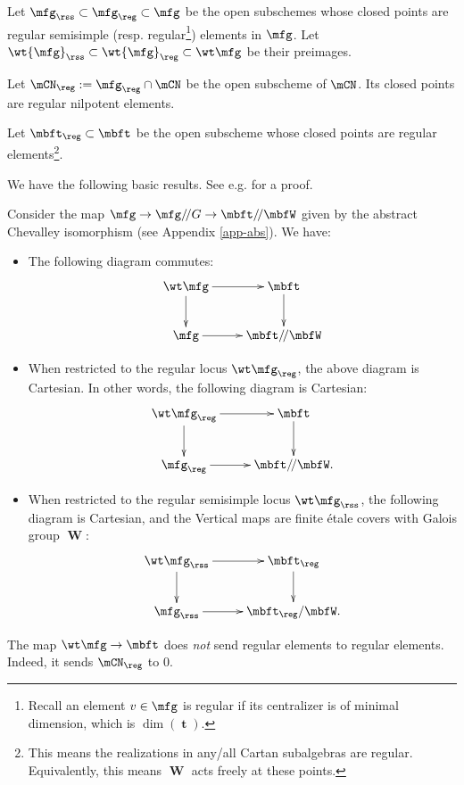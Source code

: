 	\begin{notn}
		Let $\mfg_\rss \subset \mfg_\reg \subset \mfg$ be the open subschemes whose closed points are regular semisimple (resp. regular\footnote{Recall an element $v\in \mfg$ is regular if its centralizer is of minimal dimension, which is $\dim(\mbft)$.}) elements in $\mfg$. Let $\wt{\mfg}_\rss\subset \wt{\mfg}_\reg \subset \wt\mfg$ be their preimages.

		Let $\mCN_\reg:=\mfg_\reg\cap \mCN$ be the open subscheme of $\mCN$. Its closed points are regular nilpotent elements.

		Let $\mbft_\reg\subset \mbft$ be the open subscheme whose closed points are regular elements\footnote{This means the realizations in any/all Cartan subalgebras are regular. Equivalently, this means $\mbfW$ acts freely at these points.}.
	\end{notn}

	We have the following basic results. See e.g. \cite[Section 3.1]{CG} for a proof.

	\begin{prop}
		\label{prop-Groth-alt}
		Consider the map $\mfg \to \mfg/\!/G \to \mbft/\!/\mbfW$ given by the abstract Chevalley isomorphism (see Appendix \ref{app-abs}). We have:
		\begin{itemize}
			\item[(1)]
				The following diagram commutes:
				\[
					\xymatrix{
						\wt\mfg \ar[r] \ar[d] & \mbft \ar[d] \\
						\mfg \ar[r] & \mbft/\!/\mbfW
					}
				\]
			\item[(2)]
				When restricted to the regular locus $\wt\mfg_\reg$, the above diagram is Cartesian. In other words, the following diagram is Cartesian:
				\[
					\xymatrix{
						\wt\mfg_\reg \ar[r] \ar[d] & \mbft \ar[d] \\
						\mfg_\reg \ar[r] & \mbft/\!/\mbfW.
					}
				\]
			\item[(3)]
				When restricted to the regular semisimple locus $\wt\mfg_\rss$, the following diagram is Cartesian, and the Vertical maps are finite étale covers with Galois group $\mbfW$:
				\[
					\xymatrix{
						\wt\mfg_\rss \ar[r] \ar[d] & \mbft_\reg \ar[d] \\
						\mfg_\rss \ar[r] & \mbft_\reg/\mbfW.
					}
				\]
		\end{itemize}

	\end{prop}

	\begin{warn}
		The map $\wt\mfg \to \mbft$ does \emph{not} send regular elements to regular elements. Indeed, it sends $\mCN_\reg$ to $0$.
	\end{warn}


